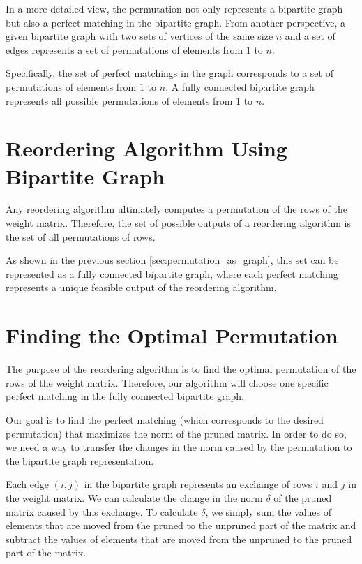 In a more detailed view, the permutation not only represents a bipartite graph but also a perfect matching in the bipartite graph. From another perspective, a given bipartite graph with two sets of vertices of the same size $n$ and a set of edges represents a set of permutations of elements from $1$ to $n$.

Specifically, the set of perfect matchings in the graph corresponds to a set of permutations of elements from $1$ to $n$. A fully connected bipartite graph represents all possible permutations of elements from $1$ to $n$.

\section{Reordering Algorithm Using Bipartite Graph}

Any reordering algorithm ultimately computes a permutation of the rows of the weight matrix. Therefore, the set of possible outputs of a reordering algorithm is the set of all permutations of rows.

As shown in the previous section \ref{sec:permutation_as_graph}, this set can be represented as a fully connected bipartite graph, where each perfect matching represents a unique feasible output of the reordering algorithm.

\section{Finding the Optimal Permutation}

The purpose of the reordering algorithm is to find the optimal permutation of the rows of the weight matrix. Therefore, our algorithm will choose one specific perfect matching in the fully connected bipartite graph.

Our goal is to find the perfect matching (which corresponds to the desired permutation) that maximizes the norm of the pruned matrix. In order to do so, we need a way to transfer the changes in the norm caused by the permutation to the bipartite graph representation.

Each edge $(i, j)$ in the bipartite graph represents an exchange of rows $i$ and $j$ in the weight matrix. We can calculate the change in the norm $\delta$ of the pruned matrix caused by this exchange. To calculate $\delta$, we simply sum the values of elements that are moved from the pruned to the unpruned part of the matrix and subtract the values of elements that are moved from the unpruned to the pruned part of the matrix.

